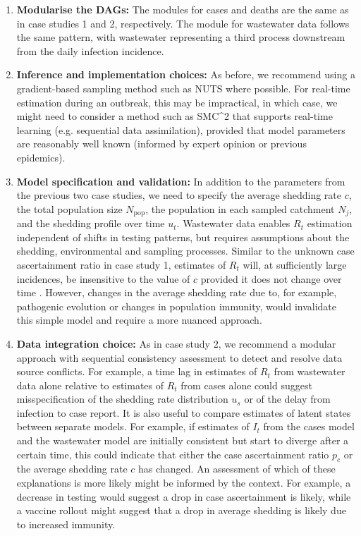 \documentclass{article}
\begin{document}
\begin{enumerate}
\item \textbf{Modularise the DAGs:} The modules for cases and deaths are the same as in case studies 1 and 2, respectively. The module for wastewater data follows the same pattern, with wastewater representing a third process downstream from the daily infection incidence.
    
    \item \textbf{Inference and implementation choices:} As before, we recommend using a gradient-based sampling method such as NUTS where possible. For real-time estimation during an outbreak, this may be impractical, in which case, we might need to consider a method such as SMC^2 that supports real-time learning (e.g. sequential data assimilation), provided that model parameters are reasonably well known (informed by expert opinion or previous epidemics).

    \item \textbf{Model specification and validation:} In addition to the parameters from the previous two case studies, we need to specify the average shedding rate $c$, the total population size $N_\mathrm{pop}$, the population in each sampled catchment $N_j$, and the shedding profile over time $u_t$. Wastewater data enables $R_t$ estimation independent of shifts in testing patterns, but requires assumptions about the shedding, environmental and sampling processes. Similar to the unknown case ascertainment ratio in case study 1, estimates of $R_t$ will, at sufficiently large incidences, be insensitive to the value of $c$ provided it does not change over time \citep{dreifuss2025estimated}. However, changes in the average shedding rate due to, for example, pathogenic evolution or changes in population immunity, would invalidate this simple model and require a more nuanced approach. 
    
    \item \textbf{Data integration choice:} As in case study 2, we recommend a modular approach with sequential consistency assessment to detect and resolve data source conflicts. For example, a time lag in estimates of $R_t$ from wastewater data alone relative to estimates of $R_t$ from cases alone could suggest misspecification of the shedding rate distribution $u_s$ or of the delay from infection to case report.  It is also useful to compare estimates of latent states between separate models. For example, if estimates of $I_t$ from the cases model and the wastewater model are initially consistent but start to diverge after a certain time, this could indicate that either the case ascertainment ratio $p_c$ or the average shedding rate $c$ has changed. An assessment of which of these explanations is more likely might be informed by the context. For example, a decrease in testing would suggest a drop in case ascertainment is likely, while a vaccine rollout might suggest that a drop in average shedding is likely due to increased immunity. 


\end{enumerate}
\end{document}
